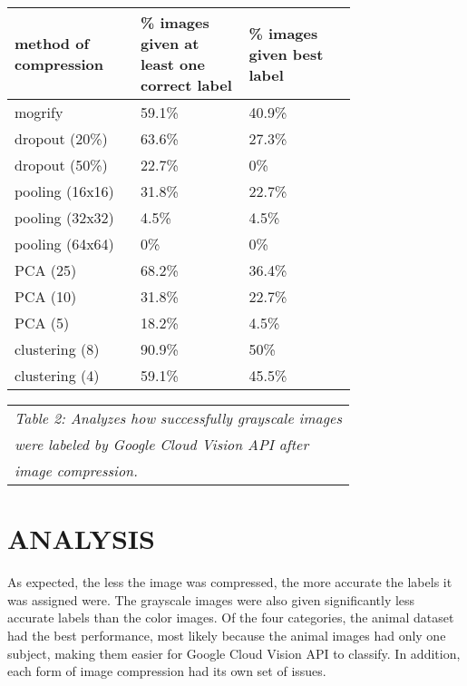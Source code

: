 \documentclass[letterpaper, 10 pt, conference]{ieeeconf}  %
\begin{document}
\bgroup
\def\arraystretch{1.2} %
\begin{tabular}{|p{0.25\linewidth}|p{0.25\linewidth}|p{0.25\linewidth}|}
\hline
{\bf method of compression} & {\bf \% images given at least one correct label}
	& {\bf \% images given best label} \\
\hline
mogrify & 59.1\% & 40.9\% \\ %
\hline
dropout (20\%) & 63.6\% & 27.3\% \\ %
\hline
dropout (50\%) & 22.7\% & 0\% \\ %
\hline
pooling (16x16) & 31.8\% & 22.7\% \\ %
\hline
pooling (32x32) & 4.5\% & 4.5\%\\ %
\hline
pooling (64x64) & 0\% & 0\% \\ %
\hline
PCA (25) & 68.2\% & 36.4\% \\ %
\hline
PCA (10) & 31.8\% & 22.7\% \\ %
\hline
PCA (5) & 18.2\% & 4.5\% \\ %
\hline
clustering (8) & 90.9\% & 50\% \\ %
\hline
clustering (4) & 59.1\% & 45.5\% \\ %
\hline
\end{tabular}
\egroup

\vspace*{2mm}
\begin{tabular}{l}
{\it Table 2: Analyzes how successfully grayscale images} \\
{\it were labeled by Google Cloud Vision API after} \\
{\it image compression.} \\
\end{tabular}

\def\arraystretch{1.0} %

\vspace*{4mm}

\section{ANALYSIS}

As expected, the less the image was compressed, the more accurate
the labels it was assigned were. The grayscale images were also
given significantly less accurate labels than the color images.
Of the four categories, the animal dataset had the best
performance, most likely because the animal images had only
one subject, making them easier for Google Cloud Vision API to classify.
In addition, each form of image
compression had its own set of issues.
\end{document}
